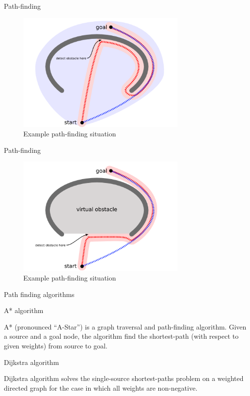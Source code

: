 \documentclass[ignorenonframetext,]{beamer}
\begin{document}
\begin{frame}{Path-finding}
\protect\hypertarget{path-finding}{}

\begin{figure}
\centering
\includegraphics[width=\textwidth,height=2.34375in]{concave1.png}
\caption{Example path-finding situation}
\end{figure}

\end{frame}

\begin{frame}{Path-finding}
\protect\hypertarget{path-finding-1}{}

\begin{figure}
\centering
\includegraphics[width=\textwidth,height=2.34375in]{concave2.png}
\caption{Example path-finding situation}
\end{figure}

\end{frame}

\begin{frame}{Path finding algorithms}
\protect\hypertarget{path-finding-algorithms}{}

\begin{block}{A* algorithm}

A* (pronounced ``A-Star'') is a graph traversal and path-finding
algorithm. Given a source and a goal node, the algorithm find the
shortest-path (with respect to given weights) from source to goal.

\end{block}

\begin{block}{Dijkstra algorithm}

Dijkstra algorithm solves the single-source shortest-paths problem on a
weighted directed graph for the case in which all weights are
non-negative.

\end{block}

\end{frame}
\end{document}
